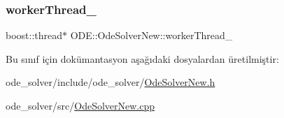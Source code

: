 \mbox{\label{classODE_1_1OdeSolverNew_a62079063cd8a49e2b8119ffd5c37707f}} 
\subsubsection{\texorpdfstring{workerThread\_}{workerThread\_}}
{\footnotesize\ttfamily boost\+::thread$\ast$ O\+D\+E\+::\+Ode\+Solver\+New\+::worker\+Thread\+\_\+\hspace{0.3cm}{\ttfamily [protected]}}



Bu sınıf için dokümantasyon aşağıdaki dosyalardan üretilmiştir\+:\begin{DoxyCompactItemize}
\item 
ode\+\_\+solver/include/ode\+\_\+solver/\mbox{\hyperlink{OdeSolverNew_8h}{Ode\+Solver\+New.\+h}}\item 
ode\+\_\+solver/src/\mbox{\hyperlink{OdeSolverNew_8cpp}{Ode\+Solver\+New.\+cpp}}\end{DoxyCompactItemize}
